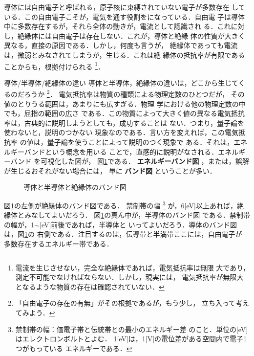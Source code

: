         導体には自由電子と呼ばれる，原子核に束縛されていない電子が多数存在
        している．この自由電子こそが，電気を通す役割をになっている．自由電
        子は導体中に多数存在するが，それら全体の動きが，電流として認識され
        る．これに対し，絶縁体には自由電子は存在しない．これが，導体と絶縁
        体の性質が大きく異なる，直接の原因である．しかし，何度も言うが，
        絶縁体であっても電流は，微弱とみなされてしまうが，生じる．これは絶
        縁体の抵抗率が有限であることからも，根拠付けられる
            \footnote{
                電流を生じさせない，完全な絶縁体であれば，電気抵抗率は無限
                大であり，測定不可能でなければならない．しかし，現実には，
                電気抵抗率が無限大となるような物質の存在は確認されていない．
            }．

        \begin{memo}{導体/半導体/絶縁体の違い}
           導体と半導体，絶縁体の違いは，どこから生じてくるのだろうか
               \footnote{
                   「自由電子の存在の有無」がその根拠であるが，もう少し，
                   立ち入って考えてみよう．
               }．
           電気抵抗率は物質の種類による物理定数のひとつだが，
           その値のとりうる範囲は，あまりにも広すぎる．物理
           学における他の物理定数の中でも，屈指の範囲の広さ
           である．この物質によって大きく値の異なる電気抵抗
           率は，古典的に説明しようとしても，成功することは
           ない．つまり，量子論を使わないと，説明のつかない
           現象なのである．言い方を変えれば，この電気抵抗率
           の値は，量子論を使うことによって説明のつく現象で
           ある．それは，エネルギーバンドという概念を用いる
           ことで，直感的に説明がなされる．エネルギーバンド
           を可視化した図が，
           図\ref{fig:Energy_Band_DHZ}である．
           \textbf{エネルギーバンド図} ，または，誤解が生じるおそれがない場合には，
           単に \textbf{バンド図} ということが多い．
               \begin{figure}[hbt]
                   \begin{center}
                       \caption{導体と半導体と絶縁体のバンド図}
                       \label{fig:Energy_Band_DHZ}
                   \end{center}
               \end{figure}

           図\ref{fig:Energy_Band_DHZ}の左側が絶縁体のバンド図である．
           禁制帯の幅
               \footnote{
                   禁制帯の幅：価電子帯と伝統帯との最小のエネルギー差
                   のこと．単位の[eV]はエレクトロンボルトとよむ．
                   1[eV]は，1[V]の電位差がある空間内で電子1つがもっている
                   エネルギーである．
               }
           が，6[eV]以上あれば，絶縁体とみなしてよいだろう．
           図\ref{fig:Energy_Band_DHZ}の真ん中が，半導体のバンド図
           である．禁制帯の幅が，1$\sim$[eV]前後であれば，半導体と
           いってよいだろう．導体のバンド図は，図\ref{fig:Energy_Band_DHZ}の
           右側である．注目するのは，伝導帯と半満帯ここには，自由電子が
           多数存在するエネルギー帯である．


\end{memo}

